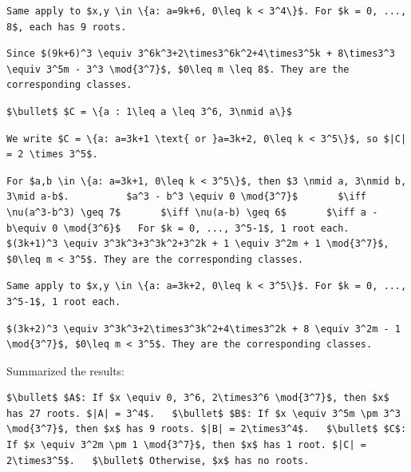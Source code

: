 \begin{enumerate}
\begin{verbatim}
Same apply to $x,y \in \{a: a=9k+6, 0\leq k < 3^4\}$. For $k = 0, ..., 8$, each has 9 roots.
\end{verbatim}

\begin{verbatim}
Since $(9k+6)^3 \equiv 3^6k^3+2\times3^6k^2+4\times3^5k + 8\times3^3 \equiv 3^5m - 3^3 \mod{3^7}$, $0\leq m \leq 8$. They are the corresponding classes.
\end{verbatim}

\begin{verbatim}
$\bullet$ $C = \{a : 1\leq a \leq 3^6, 3\nmid a\}$
\end{verbatim}

\begin{verbatim}
We write $C = \{a: a=3k+1 \text{ or }a=3k+2, 0\leq k < 3^5\}$, so $|C| = 2 \times 3^5$.
\end{verbatim}

\begin{verbatim}
For $a,b \in \{a: a=3k+1, 0\leq k < 3^5\}$, then $3 \nmid a, 3\nmid b, 3\mid a-b$.          $a^3 - b^3 \equiv 0 \mod{3^7}$       $\iff \nu(a^3-b^3) \geq 7$       $\iff \nu(a-b) \geq 6$       $\iff a - b\equiv 0 \mod{3^6}$   For $k = 0, ..., 3^5-1$, 1 root each.      $(3k+1)^3 \equiv 3^3k^3+3^3k^2+3^2k + 1 \equiv 3^2m + 1 \mod{3^7}$, $0\leq m < 3^5$. They are the corresponding classes.
\end{verbatim}

\begin{verbatim}
Same apply to $x,y \in \{a: a=3k+2, 0\leq k < 3^5\}$. For $k = 0, ..., 3^5-1$, 1 root each.
\end{verbatim}

\begin{verbatim}
$(3k+2)^3 \equiv 3^3k^3+2\times3^3k^2+4\times3^2k + 8 \equiv 3^2m - 1 \mod{3^7}$, $0\leq m < 3^5$. They are the corresponding classes.
\end{verbatim}


Summarized the results:

 \begin{verbatim}
$\bullet$ $A$: If $x \equiv 0, 3^6, 2\times3^6 \mod{3^7}$, then $x$ has 27 roots. $|A| = 3^4$.   $\bullet$ $B$: If $x \equiv 3^5m \pm 3^3 \mod{3^7}$, then $x$ has 9 roots. $|B| = 2\times3^4$.   $\bullet$ $C$: If $x \equiv 3^2m \pm 1 \mod{3^7}$, then $x$ has 1 root. $|C| = 2\times3^5$.   $\bullet$ Otherwise, $x$ has no roots.
\end{verbatim}



\end{enumerate}
